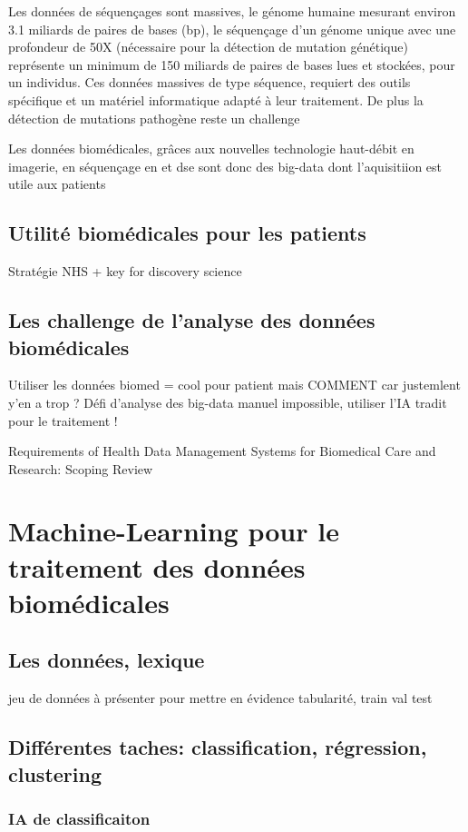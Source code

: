 Les données de séquençages sont massives, le génome humaine mesurant environ 3.1 miliards de paires de bases (bp), le séquençage d'un génome unique avec une profondeur de 50X (nécessaire pour la détection de mutation génétique) représente un minimum de 150 miliards de paires de bases lues et stockées, pour un individus. Ces données massives de type séquence, requiert des outils spécifique et un matériel informatique adapté à leur traitement. De plus la détection de mutations pathogène reste un challenge

Les données biomédicales, grâces aux nouvelles technologie haut-débit en imagerie, en séquençage en et \gls{dse} sont donc des big-data dont l'aquisitiion est utile aux patients



\subsection{Utilité biomédicales pour les patients}
Stratégie NHS + key for discovery science

\subsection{Les challenge de l'analyse des données biomédicales}
Utiliser les données biomed = cool pour patient mais COMMENT car justemlent y'en a trop ?
Défi d'analyse des big-data manuel impossible, utiliser l'IA tradit pour le traitement !

Requirements of Health Data Management Systems for Biomedical Care and Research: Scoping Review

\section{Machine-Learning pour le traitement des données biomédicales}
\subsection{Les données, lexique}
jeu de données à présenter pour mettre en évidence tabularité, train val test

\subsection{Différentes taches: classification, régression, clustering}
\subsubsection{IA de classificaiton}
